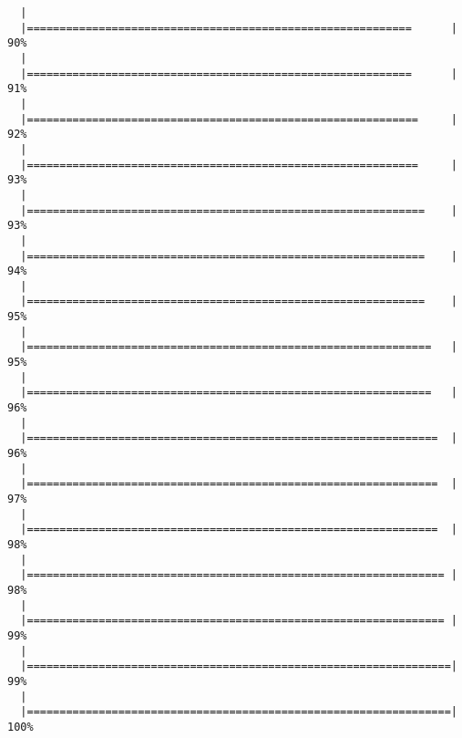 \begin{knitrout}
\begin{kframe}
\begin{verbatim}
  |                                                                       
  |===========================================================      |  90%
  |                                                                       
  |===========================================================      |  91%
  |                                                                       
  |============================================================     |  92%
  |                                                                       
  |============================================================     |  93%
  |                                                                       
  |=============================================================    |  93%
  |                                                                       
  |=============================================================    |  94%
  |                                                                       
  |=============================================================    |  95%
  |                                                                       
  |==============================================================   |  95%
  |                                                                       
  |==============================================================   |  96%
  |                                                                       
  |===============================================================  |  96%
  |                                                                       
  |===============================================================  |  97%
  |                                                                       
  |===============================================================  |  98%
  |                                                                       
  |================================================================ |  98%
  |                                                                       
  |================================================================ |  99%
  |                                                                       
  |=================================================================|  99%
  |                                                                       
  |=================================================================| 100%
\end{verbatim}
\begin{alltt}
 \hlkwb{<-}  \hlstd{=}\hlstd{)}

\end{alltt}
\end{kframe}
\end{knitrout}
